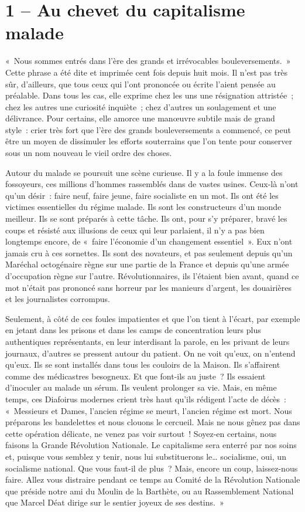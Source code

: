 \documentclass[french,twoside]{book} %
\begin{document}
\section[1 – Au chevet du capitalisme malade]{1 – Au chevet du capitalisme malade}
\noindent « Nous sommes entrés dans l’ère des grands et irrévocables bouleversements. » Cette phrase a été dite et imprimée cent fois depuis huit mois. Il n’est pas très sûr, d’ailleurs, que tous ceux qui l’ont prononcée ou écrite l’aient pensée au préalable. Dans tous les cas, elle exprime chez les uns une résignation attristée ; chez les autres une curiosité inquiète ; chez d’autres un soulagement et une délivrance. Pour certains, elle amorce une manœuvre subtile mais de grand style : crier très fort que l’ère des grands bouleversements a commencé, ce peut être un moyen de dissimuler les efforts souterrains que l’on tente pour conserver sous un nom nouveau le vieil ordre des choses.\par
Autour du malade se poursuit une scène curieuse. Il y a la foule immense des fossoyeurs, ces millions d’hommes rassemblés dans de vastes usines. Ceux-là n’ont qu’un désir : faire neuf, faire jeune, faire socialiste en un mot. Ils ont été les victimes essentielles du régime malade. Ils sont les constructeurs d’un monde meilleur. Ils se sont préparés à cette tâche. Ils ont, pour s’y préparer, bravé les coups et résisté aux illusions de ceux qui leur parlaient, il n’y a pas bien longtemps encore, de « faire l’économie d’un changement essentiel ». Eux n’ont jamais cru à ces sornettes. Ils sont des novateurs, et pas seulement depuis qu’un Maréchal octogénaire règne sur une partie de la France et depuis qu’une armée d’occupation règne sur l’autre. Révolutionnaires, ils l’étaient bien avant, quand ce mot n’était pas prononcé sans horreur par les manieurs d’argent, les douairières et les journalistes corrompus.\par
Seulement, à côté de ces foules impatientes et que l’on tient à l’écart, par exemple en jetant dans les prisons et dans les camps de concentration leurs plus authentiques représentants,   en leur interdisant la parole, en les privant de leurs journaux, d’autres se pressent autour du patient. On ne voit qu’eux, on n’entend qu’eux. Ils se sont installés dans tous les couloirs de la Maison. Ils s’affairent comme des médicastres besogneux. Et que font-ils au juste ? Ils essaient d’inoculer au malade un sérum. Ils veulent prolonger sa vie. Mais, en même temps, ces Diafoirus modernes crient très haut qu’ils rédigent l’acte de décès : « Messieurs et Dames, l’ancien régime se meurt, l’ancien régime est mort. Nous préparons les bandelettes et nous clouons le cercueil. Mais ne nous gênez pas dans cette opération délicate, ne venez pas voir surtout ! Soyez-en certains, nous faisons la Grande Révolution Nationale. Le capitalisme sera enterré par nos soins et, puisque vous semblez y tenir, nous lui substituerons le… socialisme, oui, un socialisme national. Que vous faut-il de plus ? Mais, encore un coup, laissez-nous faire. Allez vous distraire pendant ce temps au Comité de la Révolution Nationale que préside notre ami du Moulin de la Barthète, ou au Rassemblement National que Marcel Déat dirige sur le sentier joyeux de ses destins. »\par
\end{document}
